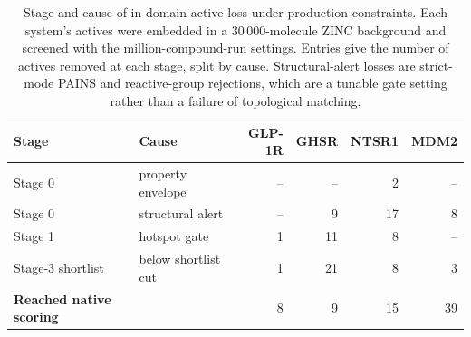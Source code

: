 \begin{table}[!t]
\caption{Stage and cause of in-domain active loss under production constraints.
Each system's actives were embedded in a 30\,000-molecule ZINC background and screened
with the million-compound-run settings. Entries give the number of actives removed at
each stage, split by cause. Structural-alert losses are strict-mode PAINS and
reactive-group rejections, which are a tunable gate setting rather than a failure of
topological matching.}
\label{tab:attrition}
\centering
\begin{tabular}{llrrrr}
\hline
Stage & Cause & GLP-1R & GHSR & NTSR1 & MDM2 \\
\hline
Stage 0 & property envelope & -- & -- & 2 & -- \\
Stage 0 & structural alert & -- & 9 & 17 & 8 \\
Stage 1 & hotspot gate & 1 & 11 & 8 & -- \\
Stage-3 shortlist & below shortlist cut & 1 & 21 & 8 & 3 \\
\hline
\textbf{Reached native scoring} & & 8 & 9 & 15 & 39 \\
\hline
\end{tabular}
\end{table}
